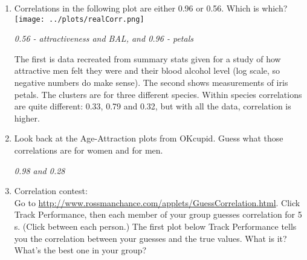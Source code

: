 \begin{enumerate}
\item Correlations in the following plot are either 0.96 or 0.56.
  Which is which?\\
\texttt{[image: ../plots/realCorr.png]}
\begin{students}
 \vspace{1cm}      
\end{students}

\begin{key}
  {\it 0.56 - attractiveness and BAL, and 0.96 - petals}
\end{key}

  The first is data recreated from summary stats given for a study of
  how attractive men felt they were and their blood alcohol level (log
  scale, so negative numbers do make sense).
  The second shows measurements of iris petals. The clusters are for
  three different species. Within
  species correlations are quite different: 0.33, 0.79 and 0.32, but
  with all the data, correlation is higher. 

\item Look back at the Age-Attraction plots from OKcupid.
  Guess what those correlations are for women and for men.
\begin{students}
 \vspace{1cm}
\end{students}

\begin{key}
  {\it 0.98  and 0.28}
\end{key}

\item Correlation contest:\\
  Go to
  \url{http://www.rossmanchance.com/applets/GuessCorrelation.html}.
  Click \fbox{$\surd$} {\sf Track Performance}, then each member of your
  group guesses correlation for 5 s. (Click  between each person.)  The first plot
  below {\sf Track Performance} tells you the correlation between your
  guesses and the true values.  What  is it? What's the best one in
  your group? 
\begin{students} 
\vspace{1cm}\newpage
\end{students}



\end{enumerate}

